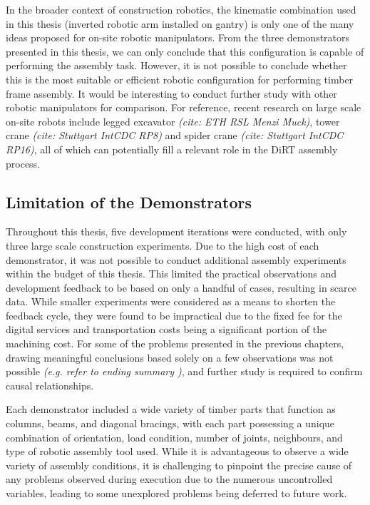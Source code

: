 In the broader context of construction robotics, the kinematic combination used in this thesis (inverted robotic arm installed on gantry) is only one of the many ideas proposed for on-site robotic manipulators. From the three demonstrators presented in this thesis, we can only conclude that this configuration is capable of performing the assembly task. However, it is not possible to conclude whether this is the most suitable or efficient robotic configuration for performing timber frame assembly. It would be interesting to conduct further study with other robotic manipulators for comparison. For reference, recent research on large scale on-site robots include legged excavator \textit{(cite: ETH RSL Menzi Muck)}, tower crane\textit{ (cite: Stuttgart IntCDC RP8)} and spider crane\textit{ (cite: Stuttgart IntCDC RP16)}, all of which can potentially fill a relevant role in the DiRT assembly process.

\subsection{Limitation of the Demonstrators}
\label{subsection:limitation-of-the-demonstrators}

Throughout this thesis, five development iterations were conducted, with only three large scale construction experiments. Due to the high cost of each demonstrator, it was not possible to conduct additional assembly experiments within the budget of this thesis. This limited the practical observations and development feedback to be based on only a handful of cases, resulting in scarce data. While smaller experiments were considered as a means to shorten the feedback cycle, they were found to be impractical due to the fixed fee for the digital services and transportation costs being a significant portion of the machining cost. For some of the problems presented in the previous chapters, drawing meaningful conclusions based solely on a few observations was not possible \textit{(e.g. refer to ending summary )}, and further study is required to confirm causal relationships. 

Each demonstrator included a wide variety of timber parts that function as columns, beams, and diagonal bracings, with each part possessing a unique combination of orientation, load condition, number of joints, neighbours, and type of robotic assembly tool used. While it is advantageous to observe a wide variety of assembly conditions, it is challenging to pinpoint the precise cause of any problems observed during execution due to the numerous uncontrolled variables, leading to some unexplored problems being deferred to future work.

